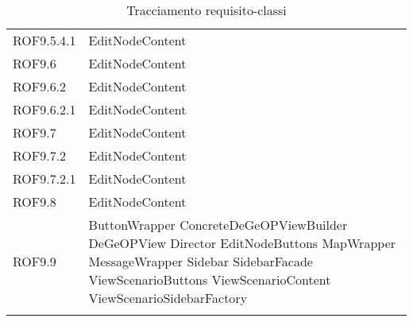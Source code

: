 \begin{longtable}{p{2.5cm}!{\VRule[1pt]}p{5cm}}
		ROF9.5.4.1 & EditNodeContent\\
		ROF9.6 & EditNodeContent\\
		ROF9.6.2 & EditNodeContent\\
		ROF9.6.2.1 & EditNodeContent\\
		ROF9.7 & EditNodeContent\\
		ROF9.7.2 & EditNodeContent\\
		ROF9.7.2.1 & EditNodeContent\\
		ROF9.8 & EditNodeContent\\
		ROF9.9 & ButtonWrapper \newline ConcreteDeGeOPViewBuilder \newline DeGeOPView \newline Director \newline EditNodeButtons \newline MapWrapper \newline MessageWrapper \newline Sidebar \newline SidebarFacade \newline ViewScenarioButtons \newline ViewScenarioContent \newline ViewScenarioSidebarFactory\\
		\caption{Tracciamento requisito-classi}
	\end{longtable}
	
	